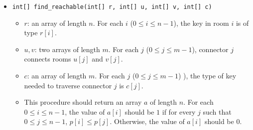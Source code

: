 \begin{itemize}
\item \texttt{int[] find\_reachable(int[] r, int[] u, int[] v, int[] c)}
\begin{itemize}

\item $r$:  an array of length $n$. For each $i$ ($0\leq i\leq n-1$), the key in room $i$ is of type $r[i]$.
\item $u,v$: two arrays of length $m$. For each $j$ ($0\leq j\leq m-1$), connector $j$ connects rooms $u[j]$ and $v[j]$.
\item $c$:  an array of length $m$. For each $j$ ($0\leq j\leq m-1$) ), the type of key needed to traverse connector $j$ is $c[j]$.
\item This procedure should return an array $a$ of length  $n$. For each $0 \leq i \leq n-1$, the value of $a[i]$ should be $1$ if for every $j$ such that $0 \leq j \leq n-1$, $p[i] \leq p[j]$. Otherwise, the value of $a[i]$ should be $0$.
\end{itemize}
\end{itemize}

